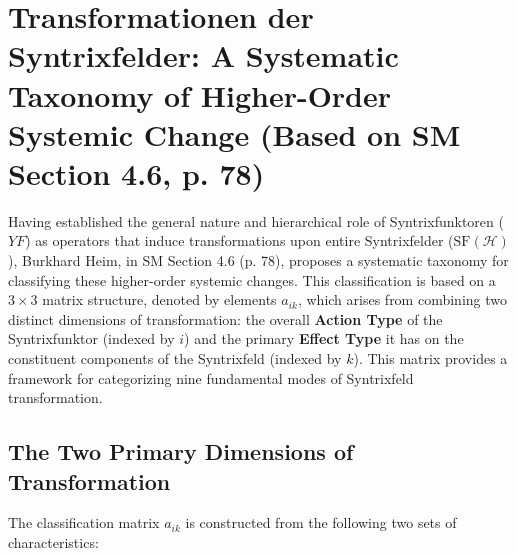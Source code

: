 \documentclass[
    12pt,              %
    a4paper,           %
    headings=normal,   %
    twoside=true,      %
    BCOR=8mm,          %
]{scrbook}
\newcommand{\syntrixfunktor}{YF}
\begin{document}
\section{Transformationen der Syntrixfelder: A Systematic Taxonomy of Higher-Order Systemic Change (Based on SM Section 4.6, p. 78)}
\label{sec:ch4_transformationen_syntrixfelder_overall_revised} 

Having established the general nature and hierarchical role of Syntrixfunktoren (\(\syntrixfunktor\)) as operators that induce transformations upon entire Syntrixfelder (\(\text{SF}(\mathcal{H})\)), Burkhard Heim, in SM Section 4.6 (p. 78), proposes a systematic taxonomy for classifying these higher-order systemic changes. This classification is based on a \(3 \times 3\) matrix structure, denoted by elements \(a_{ik}\), which arises from combining two distinct dimensions of transformation: the overall \textbf{Action Type} of the Syntrixfunktor (indexed by \(i\)) and the primary \textbf{Effect Type} it has on the constituent components of the Syntrixfeld (indexed by \(k\)). This matrix provides a framework for categorizing nine fundamental modes of Syntrixfeld transformation.

\subsection{The Two Primary Dimensions of Transformation}
\label{sec:ch4_dimensions_of_transformation_revised}

The classification matrix \(a_{ik}\) is constructed from the following two sets of characteristics:
\end{document}
